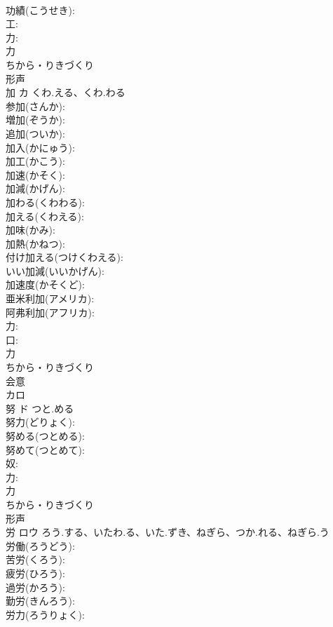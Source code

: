 \documentclass[8pt]{extreport}
\begin{document}
\begin{CJK}{UTF8}{min}
\\	功績(こうせき): 
\\	工: 
\\	力: 
\\	力	
\\	ちから・りきづくり	
\\	形声 
\\	加	カ	くわ.える、くわ.わる		
\\	参加(さんか): 
\\	増加(ぞうか): 
\\	追加(ついか): 
\\	加入(かにゅう): 
\\	加工(かこう): 
\\	加速(かそく): 
\\	加減(かげん): 
\\	加わる(くわわる): 
\\	加える(くわえる): 
\\	加味(かみ): 
\\	加熱(かねつ): 
\\	付け加える(つけくわえる): 
\\	いい加減(いいかげん): 
\\	加速度(かそくど): 
\\	亜米利加(アメリカ): 
\\	阿弗利加(アフリカ): 
\\	力: 
\\	口: 
\\	力	
\\	ちから・りきづくり	
\\	会意 
\\	カロ
\\	努	ド	つと.める		
\\	努力(どりょく): 
\\	努める(つとめる): 
\\	努めて(つとめて): 
\\	奴: 
\\	力: 
\\	力	
\\	ちから・りきづくり	
\\	形声 
\\	労	ロウ	ろう.する、いたわ.る、いた.ずき、ねぎら、つか.れる、ねぎら.う		
\\	労働(ろうどう): 
\\	苦労(くろう): 
\\	疲労(ひろう): 
\\	過労(かろう): 
\\	勤労(きんろう): 
\\	労力(ろうりょく): 

\end{CJK}
\end{document}
